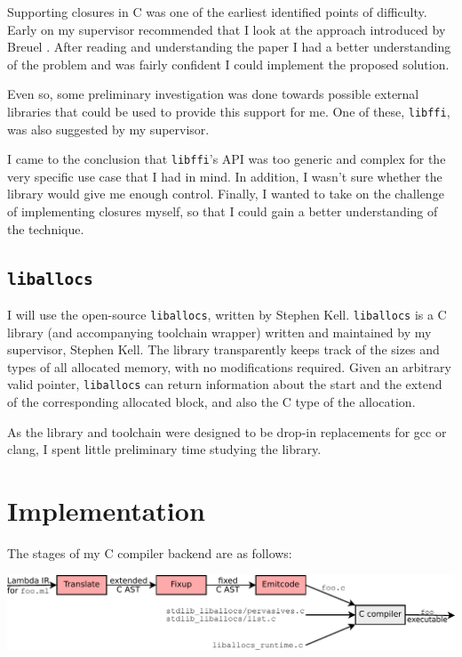 \documentclass[12pt,a4paper,twoside,openright]{report}
\begin{document}
Supporting closures in C was one of the earliest identified points of difficulty.
Early on my supervisor recommended that I look at the approach introduced by
Breuel \cite{breuel88}. After reading and understanding the paper I had a
better understanding of the problem and was fairly confident I could implement
the proposed solution.

Even so, some preliminary investigation was done towards possible external
libraries that could be used to provide this support for me. One of these,
\lstinline!libffi!, was also suggested by my supervisor.

I came to the conclusion that \lstinline!libffi!'s API was too generic
and complex for the very specific use case that I had in mind. In addition, I
wasn't sure whether the library would give me enough control. Finally, I wanted
to take on the challenge of implementing closures myself, so that I could gain
a better understanding of the technique.

\section{\texttt{liballocs}}\label{liballocs}

I will use the open-source \lstinline{liballocs}, written by Stephen Kell.
\lstinline!liballocs! is a C library (and accompanying toolchain wrapper)
written and maintained by my supervisor, Stephen Kell. The library transparently
keeps track of the sizes and types of all allocated memory, with no
modifications required. Given an arbitrary valid pointer, \lstinline!liballocs!
can return information about the start and the extend of the corresponding
allocated block, and also the C type of the allocation.

As the library and toolchain were designed to be drop-in replacements for gcc or
clang, I spent little preliminary time studying the library.



\chapter{Implementation}

The stages of my C compiler backend are as follows:

\begin{center}
  \includegraphics[width=16cm]{compiler_structure}
\end{center}
\end{document}
